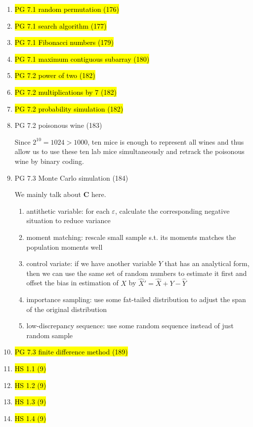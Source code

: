\documentclass[11pt]{article}
\newcommand{\bs}{\boldsymbol}
\renewcommand{\epsilon}{\varepsilon}
\newenvironment{note}{\begin{enumerate}[leftmargin=1em,topsep=0pt,noitemsep]}{\end{enumerate}}
\newenvironment{nnote}{\begin{enumerate}[leftmargin=.95em,topsep=0pt,noitemsep,label=$\bs{\cdot}$]}{\end{enumerate}}
\newcommand{\solution}{\boxed{\textbf{SOLUTION}}\hspace{.5em}}
\begin{document}
\begin{spacing}{1.1}
\begin{note}
\item \hl{PG 7.1 random permutation (176)}

\item \hl{PG 7.1 search algorithm (177)}

\item \hl{PG 7.1 Fibonacci numbers (179)}

\item \hl{PG 7.1 maximum contiguous subarray (180)}

\item \hl{PG 7.2 power of two (182)}

\item \hl{PG 7.2 multiplications by $7$ (182)}

\item \hl{PG 7.2 probability simulation (182)}

\item PG 7.2 poisonous wine (183)

\solution Since $2^10=1024>1000$, ten mice is enough to represent all wines and thus allow us to use these ten lab mice simultaneously and retrack the poisonous wine by binary coding.

\item PG 7.3 Monte Carlo simulation (184)

\solution We mainly talk about \textbf{C} here. 
\begin{nnote}
\item antithetic variable: for each $\epsilon$, calculate the corresponding negative situation to reduce variance
\item moment matching: rescale small sample s.t. its moments matches the population moments well
\item control variate: if we have another variable $Y$ that has an analytical form, then we can use the same set of random numbers to estimate it first and offset the bias in estimation of $X$ by $\hat{X}' = \hat{X} + Y - \hat{Y}$
\item importance sampling: use some fat-tailed distribution to adjust the span of the original distribution
\item low-discrepancy sequence: use some random sequence instead of just random sample
\end{nnote}

\item \hl{PG 7.3 finite difference method (189)}

\item \hl{HS 1.1 (9)}
\item \hl{HS 1.2 (9)}
\item \hl{HS 1.3 (9)}
\item \hl{HS 1.4 (9)}


\end{note}
\end{spacing}
\end{document}

